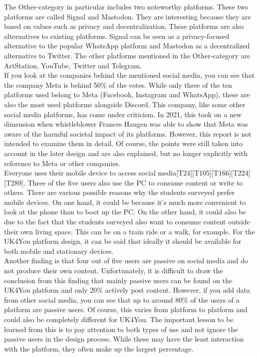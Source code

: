 The Other-category in particular includes two noteworthy platforms.
These two platforms are called Signal and Mastodon\cite{signal}\cite{mastodon}.
They are interesting because they are based on values such as privacy and decentralization.
These platforms are also alternatives to existing platforms.
Signal can be seen as a privacy-focused alternative to the popular WhatsApp platform and Mastodon as a decentralized alternative to Twitter.
The other platforms mentioned in the Other-category are ArtStation, YouTube, Twitter and Telegram.\\

If you look at the companies behind the mentioned social media, you can see that the company Meta is behind 50\% of the votes.
While only three of the ten platforms used belong to Meta (Facebook, Instagram and WhatsApp), these are also the most used platforms alongside Discord.
This company, like some other social media platforms, has come under criticism.
In 2021, this took on a new dimension when whistleblower Frances Haugen was able to show that Meta was aware of the harmful societal impact of its platforms\cite{whistleblower-meta}.
However, this report is not intended to examine them in detail.
Of course, the points were still taken into account in the later design and are also explained, but no longer explicitly with reference to Meta or other companies.\\

Everyone uses their mobile device to access social media[T24][T105][T166][T224][T289].\linebreak
Three of the five users also use the PC to consume content or write to others.
There are various possible reasons why the students surveyed prefer mobile devices.
On one hand, it could be because it's much more convenient to look at the phone than to boot up the PC.
On the other hand, it could also be due to the fact that the students surveyed also want to consume content outside their own living space.
This can be on a train ride or a walk, for example.
For the UK4You platform design, it can be said that ideally it should be available for both mobile and stationary devices.\\

Another finding is that four out of five users are passive on social media and do not produce their own content.
Unfortunately, it is difficult to draw the conclusion from this finding that mainly passive users can be found on the UK4You platform and only 20\% actively post content.
However, if you add data from other social media, you can see that up to around 80\% of the users of a platform are passive users.
Of course, this varies from platform to platform and could also be completely different for UK4You.
The important lesson to be learned from this is to pay attention to both types of use and not ignore the passive users in the design process.
While these may have the least interaction with the platform, they often make up the largest percentage.\\

